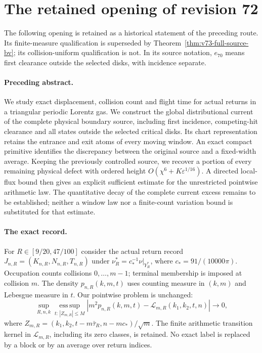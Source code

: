 \section{The retained opening of revision 72}
\label{app:v73-retained-front}
The following opening is retained as a historical statement of the preceding route. Its finite-measure qualification is superseded by Theorem~\ref{thm:v73-full-source-bv}; its collision-uniform qualification is not. In its source notation, $e_{70}$ means first clearance outside the selected disks, with incidence separate.
\paragraph{Preceding abstract.}

We study exact displacement, collision count and flight time for actual
returns in a triangular periodic Lorentz gas. We construct the global
distributional current of the complete physical boundary source,
including first incidence, competing-hit clearance and all states
outside the selected critical disks. Its chart representation retains
the entrance and exit atoms of every moving window. An exact compact
primitive identifies the discrepancy between the original source and
a fixed-width average. Keeping the previously controlled source, we
recover a portion of every remaining physical defect with ordered
height $O(\chi^6+K\varepsilon^{1/16})$. A directed local-flux bound
then gives an explicit sufficient estimate for the unrestricted
pointwise arithmetic law. The quantitative decay of the complete
current excess remains to be established; neither a window law nor
a finite-count variation bound is substituted for that estimate.



\paragraph{The exact record.}
For $R\in[9/20,47/100]$ consider the actual return record
$J_{n,R}=(K_{n,R},N_{n,R},T_{n,R})$ under
$\nu_R^*=c_*^{-1}\nu|_{Y_R^*}$, where $c_*=91/(10000\pi)$.
Occupation counts collisions $0,\ldots,m-1$; terminal membership
is imposed at collision $m$. The density $p_{n,R}(k,m,t)$ uses
counting measure in $(k,m)$ and Lebesgue measure in $t$. Our pointwise
problem is unchanged:
\begin{equation}\label{eq:intro-v72-target}
 \sup_{R,n,k}\operatorname*{ess\,sup}_{t:\,|Z_{m,R}|\le M}
 \left|m^2p_{n,R}(k,m,t)-\mathcal L_{m,R}(k_1,k_2,t,n)\right|
                  \longrightarrow0,
\end{equation}
where $Z_{m,R}=(k_1,k_2,t-m\bar\tau_R,n-mc_*)/\sqrt m$.
The finite arithmetic transition kernel in $\mathcal L_{m,R}$,
including its zero classes, is retained. No exact label is replaced
by a block or by an average over return indices.

